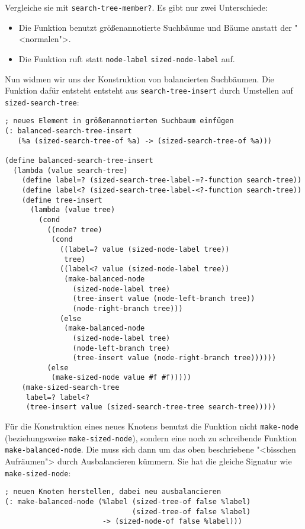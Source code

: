 %
Vergleiche sie mit \lstinline{search-tree-member?}. Es gibt nur zwei
Unterschiede:
%
\begin{itemize}
\item Die Funktion benutzt größenannotierte Suchbäume und Bäume
  anstatt der "<normalen">.
\item Die Funktion ruft statt \lstinline{node-label} 
\lstinline{sized-node-label} auf.
\end{itemize}
%
Nun widmen wir uns der Konstruktion von balancierten Suchbäumen.
Die Funktion dafür entsteht
entsteht aus \lstinline{search-tree-insert} durch
Umstellen auf \lstinline{sized-search-tree}:
%
\begin{lstlisting}
; neues Element in größenannotierten Suchbaum einfügen
(: balanced-search-tree-insert
   (%a (sized-search-tree-of %a) -> (sized-search-tree-of %a)))

(define balanced-search-tree-insert
  (lambda (value search-tree)
    (define label=? (sized-search-tree-label-=?-function search-tree))
    (define label<? (sized-search-tree-label-<?-function search-tree))
    (define tree-insert
      (lambda (value tree)
        (cond
          ((node? tree)
           (cond
             ((label=? value (sized-node-label tree))
              tree)
             ((label<? value (sized-node-label tree))
              (make-balanced-node
                (sized-node-label tree)
                (tree-insert value (node-left-branch tree))
                (node-right-branch tree)))
             (else
              (make-balanced-node
                (sized-node-label tree)
                (node-left-branch tree)
                (tree-insert value (node-right-branch tree))))))
          (else
           (make-sized-node value #f #f)))))
    (make-sized-search-tree
     label=? label<?
     (tree-insert value (sized-search-tree-tree search-tree)))))
\end{lstlisting}
%
Für die Konstruktion eines neues Knotens benutzt die Funktion nicht
\lstinline{make-node} (beziehungsweise \lstinline{make-sized-node}),
sondern eine noch zu schreibende Funktion
\lstinline{make-balanced-node}. Die muss sich dann um das oben
beschriebene "<bisschen Aufräumen"> durch Ausbalancieren kümmern.  Sie
hat die gleiche Signatur wie \lstinline{make-sized-node}:
%
\begin{lstlisting}
; neuen Knoten herstellen, dabei neu ausbalancieren
(: make-balanced-node (%label (sized-tree-of false %label)
                              (sized-tree-of false %label)
                       -> (sized-node-of false %label)))
\end{lstlisting}
